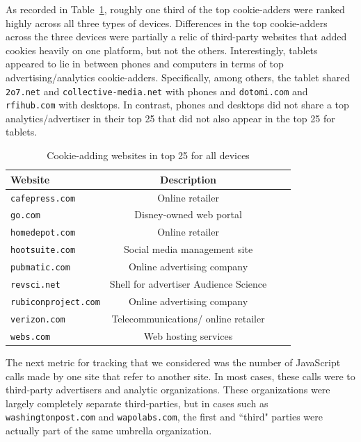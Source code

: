 \documentclass{acm_proc_article-sp}
\begin{document}
As recorded in Table~\ref{tab:major_cookies}, roughly one third of the top cookie-adders were ranked highly across all three types of devices. Differences in the top cookie-adders across the three devices were partially a relic of third-party websites that added cookies heavily on one platform, but not the others. Interestingly, tablets appeared to lie in between phones and computers in terms of top advertising/analytics cookie-adders. Specifically, among others, the tablet shared \texttt{2o7.net} and \texttt{collective-media.net} with phones and \texttt{dotomi.com} and \texttt{rfihub.com} with desktops. In contrast, phones and desktops did not share a top analytics/advertiser in their top 25 that did not also appear in the top 25 for tablets.


\begin{table}[h]
  \centering
  \caption{Cookie-adding websites in top 25 for all devices}
    \begin{tabular}{|c|c|c|c|}
    \hline
     \multicolumn{1}{|l|}{\textbf{Website}} & \textbf{Description}    \\ \hline
    \multicolumn{1}{|l|}{\texttt{cafepress.com}} & Online retailer   \\
    \multicolumn{1}{|l|}{\texttt{go.com}} & Disney-owned web portal  \\
    \multicolumn{1}{|l|}{\texttt{homedepot.com}} & Online retailer    \\
    \multicolumn{1}{|l|}{\texttt{hootsuite.com}} & Social media management site   \\
    \multicolumn{1}{|l|}{\texttt{pubmatic.com}} & Online advertising company   \\
    \multicolumn{1}{|l|}{\texttt{revsci.net}} & Shell for advertiser Audience Science    \\
    \multicolumn{1}{|l|}{\texttt{rubiconproject.com}} & Online advertising company   \\
    \multicolumn{1}{|l|}{\texttt{verizon.com}} & Telecommunications/ online retailer   \\
    \multicolumn{1}{|l|}{\texttt{webs.com}} & Web hosting services  \\ \hline
    \end{tabular}%
  \label{tab:major_cookies}%
\end{table}%

The next metric for tracking that we considered was the number of JavaScript calls made by one site that refer to another site. In most cases, these calls were to third-party advertisers and analytic organizations. These organizations were largely completely separate third-parties, but in cases such as \texttt{washingtonpost.com} and \texttt{wapolabs.com}, the first and  ``third" parties were actually part of the same umbrella organization. 
\end{document}
